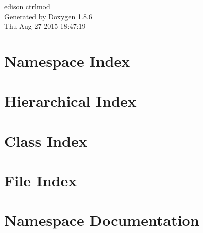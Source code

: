 \documentclass[twoside]{book}
\newcommand{\clearemptydoublepage}{%
  \newpage{\pagestyle{empty}\cleardoublepage}%
}
\begin{document}
\hypersetup{pageanchor=false}
\begin{titlepage}
\vspace*{7cm}
\begin{center}%
{\Large edison ctrlmod }\\
\vspace*{1cm}
{\large Generated by Doxygen 1.8.6}\\
\vspace*{0.5cm}
{\small Thu Aug 27 2015 18:47:19}\\
\end{center}
\end{titlepage}
\clearemptydoublepage
\tableofcontents
\clearemptydoublepage
{}
\hypersetup{pageanchor=true}

\chapter{Namespace Index}

\chapter{Hierarchical Index}

\chapter{Class Index}

\chapter{File Index}

\chapter{Namespace Documentation}


\end{document}
